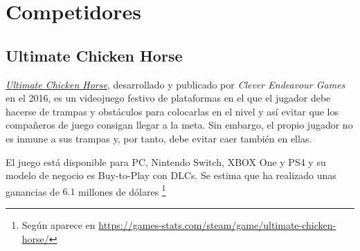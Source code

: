 \section{Competidores} %

\subsection{Ultimate Chicken Horse}

\href{https://www.cleverendeavourgames.com/ultimate-chicken-horse/}{\emph{Ultimate
Chicken Horse}}, desarrollado y publicado por \emph{Clever Endeavour Games} en
el 2016, es un videojuego festivo de plataformas en el que el jugador debe
hacerse de trampas y obstáculos para colocarlas en el nivel y así evitar que los
compañeros de juego consigan llegar a la meta. Sin embargo, el propio jugador no
es inmune a sus trampas y, por tanto, debe evitar caer también en ellas.

El juego está disponible para PC, Nintendo Switch, XBOX One y PS4 y su modelo de
negocio es Buy-to-Play con DLCs. Se estima que ha realizado unas ganancias de
$6.1$ millones de dólares \footnote{Según aparece en
\url{https://games-stats.com/steam/game/ultimate-chicken-horse/}}

